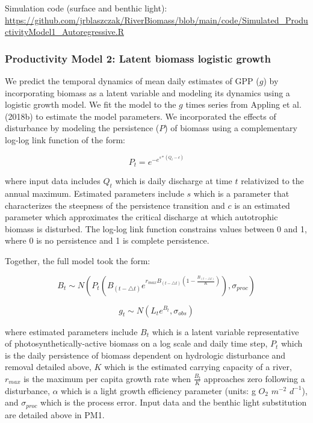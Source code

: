 \documentclass[]{article}
\begin{document}
Simulation code (surface and benthic light):
\url{https://github.com/jrblaszczak/RiverBiomass/blob/main/code/Simulated_ProductivityModel1_Autoregressive.R}

\subsubsection{Productivity Model 2: Latent biomass logistic
growth}\label{productivity-model-2-latent-biomass-logistic-growth}

We predict the temporal dynamics of mean daily estimates of GPP (\(g\))
by incorporating biomass as a latent variable and modeling its dynamics
using a logistic growth model. We fit the model to the \(g\) times
series from Appling et al. (2018b) to estimate the model parameters. We
incorporated the effects of disturbance by modeling the persistence
(\(P\)) of biomass using a complementary log-log link function of the
form:

\begin{equation}
    P_{t} = e^{-e^{s*(Q_{t} - c)}}
\end{equation}

where input data includes \(Q_t\) which is daily discharge at time \(t\)
relativized to the annual maximum. Estimated parameters include \(s\)
which is a parameter that characterizes the steepness of the persistence
transition and \(c\) is an estimated parameter which approximates the
critical discharge at which autotrophic biomass is disturbed. The
log-log link function constrains values between 0 and 1, where 0 is no
persistence and 1 is complete persistence.

Together, the full model took the form:

\begin{equation}
    B_{t} \sim N(P_{t}(B_{(t-\triangle t)} e^{r_{max}B_{(t-\triangle t)}(1-\frac{B_{(t-\triangle t)}}{K})}), \sigma_{proc})
\end{equation}

\begin{equation}
    g_{t} \sim N(L_{t} e^{B_{t}}, \sigma_{obs})
\end{equation}

where estimated parameters include \(B_{t}\) which is a latent variable
representative of photosynthetically-active biomass on a log scale and
daily time step, \(P_{t}\) which is the daily persistence of biomass
dependent on hydrologic disturbance and removal detailed above, \(K\)
which is the estimated carrying capacity of a river, \(r_{max}\) is the
maximum per capita growth rate when \(\frac {B_t}{K}\) approaches zero
following a disturbance, \(\alpha\) which is a light growth efficiency
parameter (units: g \(O_2\) \(m^{-2}\) \(d^{-1}\)), and
\(\sigma_{proc}\) which is the process error. Input data and the benthic
light substitution are detailed above in PM1.
\end{document}
